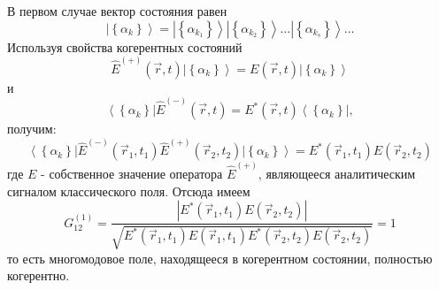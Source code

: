 В первом случае вектор состояния равен
\[
\left|\left\{\alpha_{k}\right\}\right> = 
\left|\left\{\alpha_{k_1}\right\}\right>
\left|\left\{\alpha_{k_2}\right\}\right>
\dotsc
\left|\left\{\alpha_{k_s}\right\}\right>
\dots 
\]
Используя свойства когерентных состояний
\[
\hat{E}^{(+)}\left(\vec{r},
t\right)\left|\left\{\alpha_{k}\right\}\right> = 
E\left(\vec{r},
t\right)
\left|\left\{\alpha_{k}\right\}\right>
\]
и
\[
\left<\left\{\alpha_{k}\right\}\right|\hat{E}^{(-)}\left(\vec{r},
t\right) = 
E^{*}\left(\vec{r},
t\right)\left<\left\{\alpha_{k}\right\}\right|,
\]
получим:
\[
\left<\left\{\alpha_{k}\right\}\right|\hat{E}^{(-)}\left(\vec{r}_1,
t_1\right)\hat{E}^{(+)}\left(\vec{r}_2,
t_2\right)\left|\left\{\alpha_{k}\right\}\right> = 
E^{*}\left(\vec{r}_1, t_1\right)E\left(\vec{r}_2,t_2\right) 
\]
где $E$ - собственное значение оператора $\hat{E}^{(+)}$,  являющееся
аналитическим сигналом классического поля. Отсюда имеем 
\begin{equation}
G_{12}^{(1)} = 
\frac{\left|
E^{*}\left(\vec{r}_1, t_1\right)E\left(\vec{r}_2,t_2\right)
\right|}{\sqrt{
E^{*}\left(\vec{r}_1, t_1\right)E\left(\vec{r}_1,t_1\right)
E^{*}\left(\vec{r}_2, t_2\right)E\left(\vec{r}_2,t_2\right)
}} 
= 1
\label{eqCh4_17}
\end{equation}
то есть многомодовое поле, находящееся в когерентном состоянии,
полностью когерентно.  

